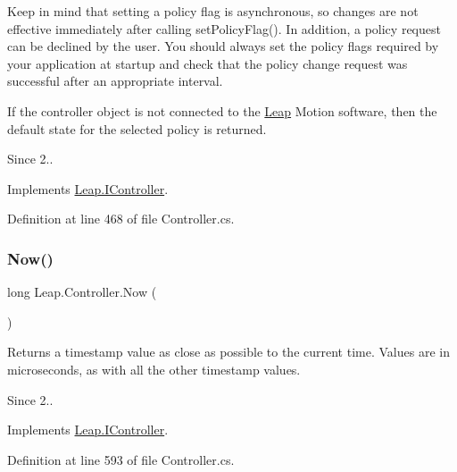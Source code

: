 Keep in mind that setting a policy flag is asynchronous, so changes are not effective immediately after calling set\+Policy\+Flag(). In addition, a policy request can be declined by the user. You should always set the policy flags required by your application at startup and check that the policy change request was successful after an appropriate interval.

If the controller object is not connected to the \mbox{\hyperlink{namespace_leap}{Leap}} Motion software, then the default state for the selected policy is returned.

\begin{DoxySince}{Since}
2.. 
\end{DoxySince}


Implements \mbox{\hyperlink{interface_leap_1_1_i_controller_abdb91a0a5278f41c91cb92e37854c27c}{Leap.\+I\+Controller}}.



Definition at line 468 of file Controller.\+cs.

\mbox{\label{class_leap_1_1_controller_a57650944fa868adcfe4cea8608af5a03}} 
\subsubsection{\texorpdfstring{Now()}{Now()}}
{\footnotesize\ttfamily long Leap.\+Controller.\+Now (\begin{DoxyParamCaption}{ }\end{DoxyParamCaption})}



Returns a timestamp value as close as possible to the current time. Values are in microseconds, as with all the other timestamp values. 

\begin{DoxySince}{Since}
2.. 
\end{DoxySince}


Implements \mbox{\hyperlink{interface_leap_1_1_i_controller_a965ef8281ece6db686682378a71ce38c}{Leap.\+I\+Controller}}.



Definition at line 593 of file Controller.\+cs.

\mbox{\label{class_leap_1_1_controller_afb73429c5375282477149dfbb9cc698f}} 
